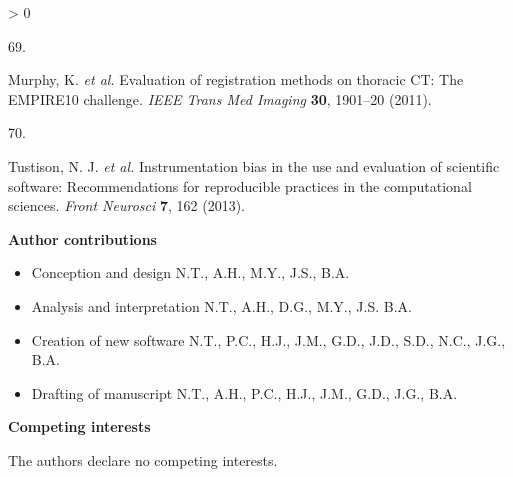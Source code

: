 \documentclass[
  12pt,
]{article}
\newlength{\cslhangindent}
\newlength{\csllabelwidth}
\newenvironment{CSLReferences}[3] %
 {%
  \setlength{\parindent}{0pt}
  \ifodd #1 \everypar{\setlength{\hangindent}{\cslhangindent}}\ignorespaces\fi
  \ifnum #2 > 0
  \setlength{\parskip}{#3\baselineskip}
  \fi
 }%
 {}
\newcommand{\CSLLeftMargin}[1]{\parbox[t]{\maxof{\widthof{#1}}{\csllabelwidth}}{#1}}
\newcommand{\CSLRightInline}[1]{\parbox[t]{\linewidth}{#1}}
\begin{document}
\begin{CSLReferences}{0}{0}
\leavevmode\hypertarget{ref-Murphy:2011aa}{}%
\CSLLeftMargin{69. }
\CSLRightInline{Murphy, K. \emph{et al.} Evaluation of registration
methods on thoracic {CT}: The {EMPIRE10} challenge. \emph{IEEE Trans Med
Imaging} \textbf{30}, 1901--20 (2011).}

\leavevmode\hypertarget{ref-Tustison:2013aa}{}%
\CSLLeftMargin{70. }
\CSLRightInline{Tustison, N. J. \emph{et al.} Instrumentation bias in
the use and evaluation of scientific software: Recommendations for
reproducible practices in the computational sciences. \emph{Front
Neurosci} \textbf{7}, 162 (2013).}

\end{CSLReferences}



\clearpage

{\bf Author contributions}

\begin{itemize}
\item Conception and design N.T., A.H., M.Y., J.S., B.A.
\item Analysis and interpretation  N.T., A.H., D.G., M.Y., J.S. B.A.
\item Creation of new software N.T., P.C., H.J., J.M., G.D., J.D., S.D., N.C., J.G., B.A.
\item Drafting of manuscript N.T., A.H., P.C., H.J., J.M., G.D., J.G., B.A.
\end{itemize}

{\bf Competing interests}

The authors declare no competing interests.
\end{document}
